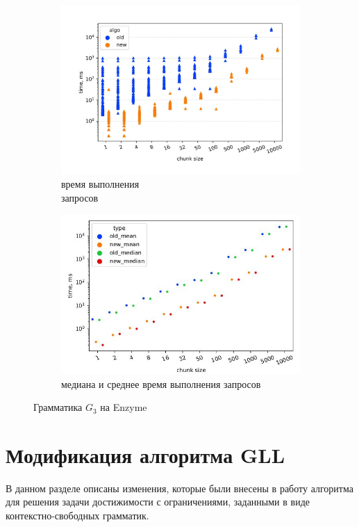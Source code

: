 \documentclass[14pt]{matmex-diploma-custom}
\theoremstyle{definition}
\begin{document}
\begin{figure}[H]
\begin{subfigure}[b]{0.5\textwidth}
    \centering
    \includegraphics[width=\columnwidth]{pics/bt_old_new.pdf_1.jpg}  \caption{время выполнения \\ запросов}
    \label{fig:subim1}
    \end{subfigure}%
    \begin{subfigure}[b]{0.5\textwidth}
    \centering
    \includegraphics[width=\textwidth]{pics/bt_old_new_mean&median.pdf_1.jpg} \caption{медиана и среднее время выполнения запросов}
    \label{fig:subim2}
    \end{subfigure} \caption{Грамматика $G_3$ на Enzyme}
\label{old_new3}
\end{figure}

\section{Модификация алгоритма GLL}
В данном разделе описаны изменения, которые были внесены в работу алгоритма для решения задачи достижимости с ограничениями, заданными в виде контекстно-свободных грамматик.
\end{document}
